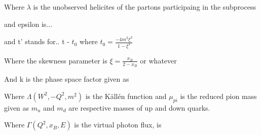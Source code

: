     Where $\lambda$ is the unobserved helicites of the partons participaing in the subprocess
    
 and epsilon is... 
    
    
    and t' stands for.. t - $t_0$ where $t_0 = \frac{-4m^2\xi^2}{1-\xi^2}$
    
    
    Where the skewness parameter is $\xi = \frac{x_B}{2-x_B}$ or whatever
       
    And k is the phase space factor given as 
    
        Where $\Lambda(W^2,-Q^2,m^2)$ is the Källén function and $\mu_{pi}$ is the reduced pion mass given as 
    $m_u$ and $m_d$ are respective masses of up and down quarks.
    
     Where $\Gamma (Q^2, x_B, E)$ is the virtual photon flux, is 





\newcommand{\GPDH}{\textcolor{lightred}{${H}$}}
\newcommand{\GPDHEQ}{\textcolor{lightred}{{H}}}

\newcommand{\GPDE}{\textcolor{lightgreen}{${E}$}}
\newcommand{\GPDEEQ}{\textcolor{lightgreen}{{E}}}

\newcommand{\GPDHtilde}{\textcolor{lightorange}{$\tilde{H}$}}
\newcommand{\GPDHtildeEQ}{\textcolor{lightorange}{\tilde{H}}}

\newcommand{\GPDEtilde}{\textcolor{lightblue}{$\tilde{E}$}}
\newcommand{\GPDEtildeEQ}{\textcolor{lightblue}{\tilde{E}}}




\newcommand{\GPDHT}{\textcolor{darkred}{$H_T$}}
\newcommand{\GPDHTEQ}{\textcolor{darkred}{H_T}}

